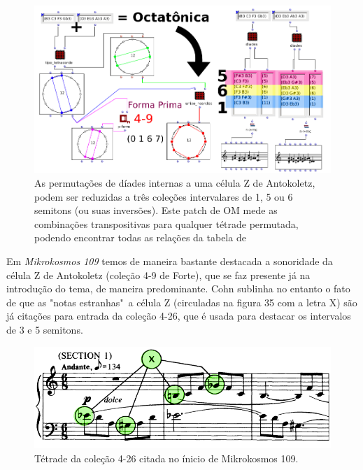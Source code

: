 \documentclass[
	12pt,				%
	openright,			%
	twoside,			%
	a4paper,			%
	english,			%
	french,				%
	spanish,			%
	brazil				%
	]{abntex2}
\begin{document}
\begin{figure}[!h]
	\caption{\label{fig_grafico} As permutações de díades internas a uma célula Z de Antokoletz, podem ser reduzidas a três coleções intervalares de 1, 5 ou 6 semitons (ou suas inversões). Este patch de OM mede as combinações transpositivas para qualquer tétrade permutada, podendo encontrar todas as relações da tabela de  }
	\begin{center}
	    \includegraphics[scale=0.55]{octa/permutaCEL_Z.png}
	\end{center}
\end{figure}

Em \textit{Mikrokosmos 109} temos de maneira bastante destacada a sonoridade da célula Z de Antokoletz (coleção 4-9 de Forte), que se faz presente já na introdução do tema, de maneira predominante. Cohn sublinha no entanto o fato de que as "notas estranhas"\ a célula Z (circuladas na figura 35 com a letra X) são já citações para entrada da coleção 4-26, que é usada para destacar os intervalos de 3 e 5 semitons.

\begin{figure}[!h]
	\caption{\label{fig_grafico} Tétrade da coleção 4-26 citada no ínicio de Mikrokosmos 109. }
	\begin{center}
	    \includegraphics[scale=0.3]{octa/mikro_Bali01.png}
	\end{center}
\end{figure}
\end{document}
